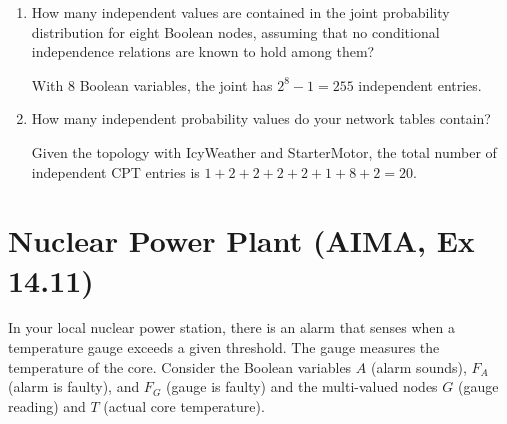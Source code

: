 \documentclass[11pt, a4paper]{article}
\begin{document}
\begin{enumerate}
    \item How many independent values are contained in the joint probability distribution for eight Boolean nodes, assuming that no conditional independence relations are known to hold among them?

    \begin{solution}
        With 8 Boolean variables, the joint has $2^8 - 1 = 255$ independent entries.
    \end{solution}

    \item How many independent probability values do your network tables contain?

    \begin{solution}
        Given the topology with IcyWeather and StarterMotor, the total number of independent CPT entries is $1 + 2 + 2 + 2 + 2 + 1 + 8 + 2 = 20$.
    \end{solution}
\end{enumerate}

\newpage

\section{Nuclear Power Plant (AIMA, Ex 14.11)}

In your local nuclear power station, there is an alarm that senses when a temperature gauge exceeds a given threshold. The gauge measures the temperature of the core. Consider the Boolean variables $A$ (alarm sounds), $F_A$ (alarm is faulty), and $F_G$ (gauge is faulty) and the multi-valued nodes $G$ (gauge reading) and $T$ (actual core temperature).
\end{document}
